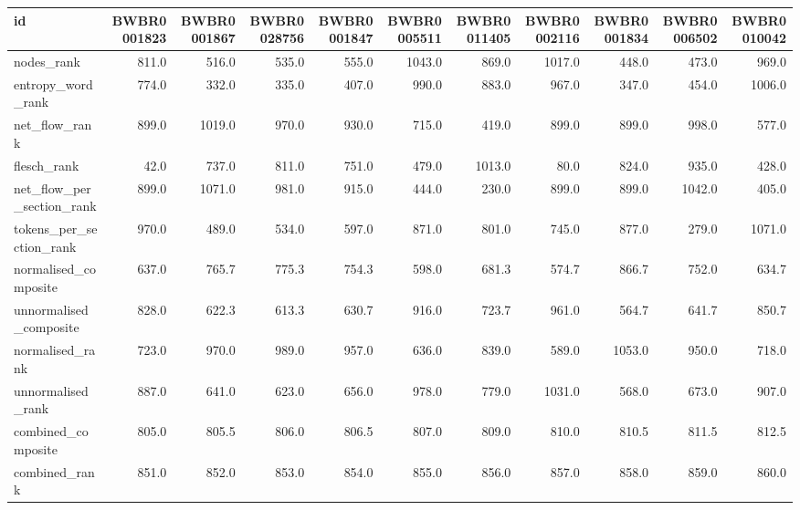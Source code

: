 \begin{tabular}{lrrrrrrrrrr}
\toprule
id & BWBR0001823 & BWBR0001867 & BWBR0028756 & BWBR0001847 & BWBR0005511 & BWBR0011405 & BWBR0002116 & BWBR0001834 & BWBR0006502 & BWBR0010042 \\
\midrule
nodes\_rank & 811.0 & 516.0 & 535.0 & 555.0 & 1043.0 & 869.0 & 1017.0 & 448.0 & 473.0 & 969.0 \\
\cline{1-11}
entropy\_word\_rank & 774.0 & 332.0 & 335.0 & 407.0 & 990.0 & 883.0 & 967.0 & 347.0 & 454.0 & 1006.0 \\
\cline{1-11}
net\_flow\_rank & 899.0 & 1019.0 & 970.0 & 930.0 & 715.0 & 419.0 & 899.0 & 899.0 & 998.0 & 577.0 \\
\cline{1-11}
flesch\_rank & 42.0 & 737.0 & 811.0 & 751.0 & 479.0 & 1013.0 & 80.0 & 824.0 & 935.0 & 428.0 \\
\cline{1-11}
net\_flow\_per\_section\_rank & 899.0 & 1071.0 & 981.0 & 915.0 & 444.0 & 230.0 & 899.0 & 899.0 & 1042.0 & 405.0 \\
\cline{1-11}
tokens\_per\_section\_rank & 970.0 & 489.0 & 534.0 & 597.0 & 871.0 & 801.0 & 745.0 & 877.0 & 279.0 & 1071.0 \\
\cline{1-11}
normalised\_composite & 637.0 & 765.7 & 775.3 & 754.3 & 598.0 & 681.3 & 574.7 & 866.7 & 752.0 & 634.7 \\
\cline{1-11}
unnormalised\_composite & 828.0 & 622.3 & 613.3 & 630.7 & 916.0 & 723.7 & 961.0 & 564.7 & 641.7 & 850.7 \\
\cline{1-11}
normalised\_rank & 723.0 & 970.0 & 989.0 & 957.0 & 636.0 & 839.0 & 589.0 & 1053.0 & 950.0 & 718.0 \\
\cline{1-11}
unnormalised\_rank & 887.0 & 641.0 & 623.0 & 656.0 & 978.0 & 779.0 & 1031.0 & 568.0 & 673.0 & 907.0 \\
\cline{1-11}
combined\_composite & 805.0 & 805.5 & 806.0 & 806.5 & 807.0 & 809.0 & 810.0 & 810.5 & 811.5 & 812.5 \\
\cline{1-11}
combined\_rank & 851.0 & 852.0 & 853.0 & 854.0 & 855.0 & 856.0 & 857.0 & 858.0 & 859.0 & 860.0 \\
\cline{1-11}
\bottomrule
\end{tabular}
